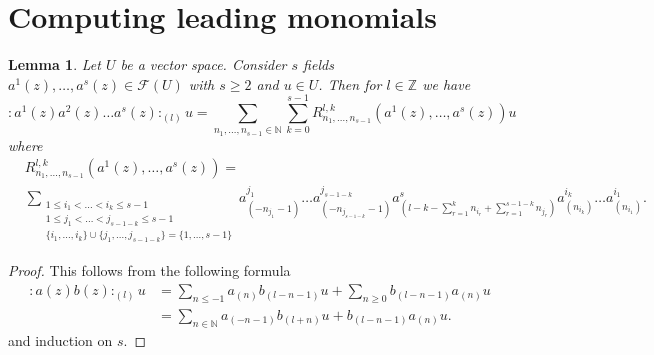\documentclass[12pt,a4paper]{article}
\newtheorem{lemma}{Lemma}
\begin{document}
\section{Computing leading monomials}
\label{sec:comp-lead-monom}

\begin{lemma}
  \label{lmm:7}
  Let $U$ be a vector space.
  Consider $s$ fields $a^1(z),\dots,a^s(z)\in \mathcal{F}(U)$ with $s\ge 2$ and $u\in U$.
  Then for $l\in \mathbb{Z}$ we have
  \begin{equation*}
    :a^1(z)a^2(z)\dots a^s(z):_{(l)}u=\sum_{n_1,\dots,n_{s-1}\in \mathbb{N}}\sum_{k=0}^{s-1}R^{l,k}_{n_1,\dots,n_{s-1}}(a^1(z),\dots,a^s(z))u
  \end{equation*}
  where
  \begin{align*}
    &R^{l,k}_{n_1,\dots,n_{s-1}}(a^1(z),\dots,a^s(z))=\\
    &\sum_{\substack{1\le i_1<\dots<i_k\le s-1\\1\le j_1<\dots<j_{s-1-k}\le s-1\\\{i_1,\dots,i_k\}\cup\{j_1,\dots,j_{s-1-k}\}=\{1,\dots,s-1\}}}a^{j_1}_{(-n_{j_1}-1)}\dots a^{j_{s-1-k}}_{(-n_{j_{s-1-k}}-1)}a^s_{(l-k-\sum_{r=1}^k n_{i_r}+\sum_{r=1}^{s-1-k}n_{j_r})}a^{i_k}_{(n_{i_k})}\dots a^{i_1}_{(n_{i_1})}.
  \end{align*}
\end{lemma}
\begin{proof}
  This follows from the following formula
  \begin{align*}
    :a(z)b(z):_{(l)}u&=\sum_{n\le -1}a_{(n)}b_{(l-n-1)}u+\sum_{n\ge 0}b_{(l-n-1)}a_{(n)}u \\
    &=\sum_{n\in \mathbb{N}}a_{(-n-1)}b_{(l+n)}u+b_{(l-n-1)}a_{(n)}u.
  \end{align*}
  and induction on $s$.
\end{proof}
\end{document}
